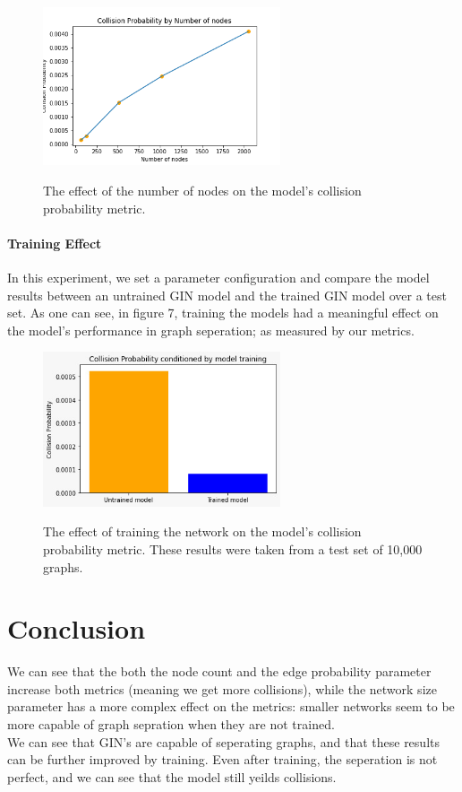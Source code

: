 \documentclass{article}
\begin{document}
\begin{figure}
    \begin{center}
        \includegraphics[width=7cm]{../figures/Collision_Probability_num_nodes.png}\\
        \caption{The effect of the number of nodes on the model's collision probability metric.}
    \end{center}
\end{figure}    

\subsection*{Training Effect}
In this experiment, we set a parameter configuration and compare the model results between an untrained GIN model
and the trained GIN model over a test set.
As one can see, in figure 7, training the models had a
meaningful effect on the model's performance in graph seperation; as measured by our metrics.
\begin{figure}
    \begin{center}
        \includegraphics[width=7cm]{../figures/Training_Performance_Bars.png}\\
        \caption{The effect of training the network on the model's collision probability metric.
        These results were taken from a test set of 10,000 graphs.}
    \end{center}
\end{figure}    


\part*{Conclusion}
We can see that the both the node count and the edge probability parameter increase both metrics (meaning we get more collisions),
while the network size parameter has a more complex effect on the metrics: smaller networks seem to be more capable of graph sepration
when they are not trained.\\
We can see that GIN's are capable of seperating graphs, and that these results can be further improved by training.
Even after training, the seperation is not perfect, and we can see that the model still yeilds collisions.
\end{document}
